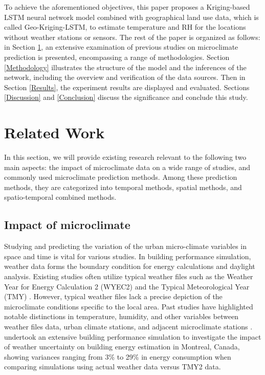 \documentclass[a4paper,fleqn]{cas-sc}
\begin{document}
To achieve the aforementioned objectives, this paper proposes a Kriging-based LSTM neural network model combined with geographical land use data, which is called Geo-Kriging-LSTM, to estimate temperature and RH for the locations without weather stations or sensors. 
The rest of the paper is organized as follows: in Section \ref{Related Work}, an extensive examination of previous studies on microclimate prediction is presented, encompassing a range of methodologies. Section \ref{Methodology} illustrates the structure of the model and the inferences of the network, including the overview and verification of the data sources. Then in Section \ref{Results}, the experiment results are displayed and evaluated. Sections \ref{Discussion} and \ref{Conclusion} discuss the significance and conclude this study.


\section{Related Work}\label{Related Work}

In this section, we will provide existing research relevant to the following two main aspects: the impact of microclimate data on a wide range of studies, and commonly used microclimate prediction methods. Among these prediction methods, they are categorized into temporal methods, spatial methods, and spatio-temporal combined methods.

\subsection{Impact of microclimate}

Studying and predicting the variation of the urban micro-climate variables in space and time is vital for various studies. In building performance simulation, weather data forms the boundary condition for energy calculations and daylight analysis. Existing studies often utilize typical weather files such as the Weather Year for Energy Calculation 2 (WYEC2) and the Typical Meteorological Year (TMY) \citep{han2021using}. However, typical weather files lack a precise depiction of the microclimate conditions specific to the local area. Past studies have highlighted notable distinctions in temperature, humidity, and other variables between weather files data, urban climate stations, and adjacent microclimate stations \citep{wang2021benchmarking,lazos2014optimisation}. \cite{hosseini2017energy} undertook an extensive building performance simulation to investigate the impact of weather uncertainty on building energy estimation in Montreal, Canada, showing variances ranging from 3\% to 29\% in energy consumption when comparing simulations using actual weather data versus TMY2 data. 
\end{document}
